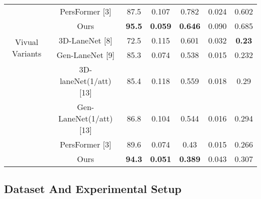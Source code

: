 \begin{table*}[!ht]
\begin{tabular}{ccccccc}
        \multirow{2}{*}{ }               & PersFormer [3] & 87.5 & 0.107 & 0.782 & 0.024 & 0.602 \\
        \multirow{2}{*}{ }               & Ours       & \textbf{95.5} & \textbf{0.059} & \textbf{0.646} & 0.090 & 0.685 \\
        \midrule %
        \multirow{2}{*}{Vivual Variants} & 3D-LaneNet [8] & 72.5 & 0.115 & 0.601 & 0.032 & \textbf{0.23}  \\
        \multirow{2}{*}{ }               & Gen-LaneNet [9] & 85.3 & 0.074 & 0.538 & 0.015 & 0.232  \\
        \multirow{2}{*}{ }               & 3D-laneNet(1/att) [13] & 85.4 & 0.118 & 0.559 & 0.018 & 0.29  \\
        \multirow{2}{*}{ }               & Gen-LaneNet(1/att) [13] & 86.8 & 0.104 & 0.544 & 0.016 & 0.294  \\
        \multirow{2}{*}{ }               & PersFormer [3] & 89.6 & 0.074 & 0.43  & 0.015 & 0.266 \\
        \multirow{2}{*}{ }               & Ours       & \textbf{94.3} &\textbf{ 0.051} & \textbf{0.389} & 0.043 & 0.307 \\
        \bottomrule %
    \end{tabular}
\end{table*}

\subsection{Dataset And Experimental Setup}
\label{subsec:Dataset And Experimental Setup}

